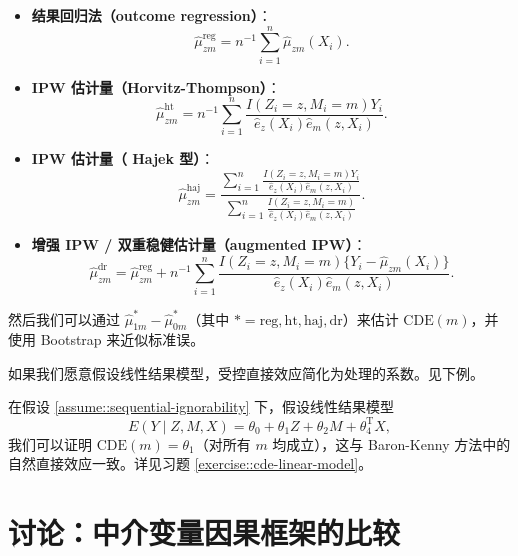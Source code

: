 \begin{itemize}
\item \textbf{结果回归法（outcome regression）}：
\begin{equation}
\hat{\mu}_{zm}^{\mathrm{reg}} = n^{-1}\sum_{i=1}^{n}\hat{\mu}_{zm}(X_i).
\end{equation}
\item \textbf{IPW 估计量（Horvitz-Thompson）}：
\begin{equation}
\hat{\mu}_{zm}^{\mathrm{ht}} = n^{-1}\sum_{i=1}^{n}\frac{I(Z_i=z, M_i=m)Y_i}{\hat{e}_z(X_i)\hat{e}_m(z,X_i)}.
\end{equation}
\item \textbf{IPW 估计量（ Hajek 型）}：
\begin{equation}
\hat{\mu}_{zm}^{\mathrm{haj}} = \frac{\sum_{i=1}^{n}\frac{I(Z_i=z, M_i=m)Y_i}{\hat{e}_z(X_i)\hat{e}_m(z,X_i)}}{\sum_{i=1}^{n}\frac{I(Z_i=z, M_i=m)}{\hat{e}_z(X_i)\hat{e}_m(z,X_i)}}.
\end{equation}
\item \textbf{增强 IPW / 双重稳健估计量（augmented IPW）}：
\begin{equation}
\hat{\mu}_{zm}^{\mathrm{dr}} = \hat{\mu}_{zm}^{\mathrm{reg}} + n^{-1}\sum_{i=1}^{n}\frac{I(Z_i=z, M_i=m)\{Y_i - \hat{\mu}_{zm}(X_i)\}}{\hat{e}_z(X_i)\hat{e}_m(z,X_i)}.
\end{equation}
\end{itemize}

然后我们可以通过 $\hat{\mu}_{1m}^{*} - \hat{\mu}_{0m}^{*}$（其中 $*=\mathrm{reg,ht,haj,dr}$）来估计 $\mathrm{CDE}(m)$，并使用 Bootstrap 来近似标准误。

如果我们愿意假设线性结果模型，受控直接效应简化为处理的系数。见下例。

\begin{Example}
\label{ex::cde-linear}
在假设 \ref{assume::sequential-ignorability} 下，假设线性结果模型
\begin{equation}
E(Y\mid Z,M,X) = \theta_0 + \theta_1 Z + \theta_2 M + \theta_4^{\mathrm{T}}X,
\end{equation}
我们可以证明 $\mathrm{CDE}(m)=\theta_1$（对所有 $m$ 均成立），这与 Baron-Kenny 方法中的自然直接效应一致。详见习题 \ref{exercise::cde-linear-model}。
\end{Example}

\section{讨论：中介变量因果框架的比较}
\label{sec::cde-discussion}

